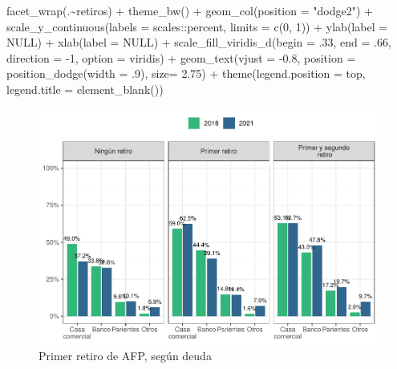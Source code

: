 \documentclass[
  12pt,
]{book}
\newenvironment{Shaded}{\begin{snugshade}}{\end{snugshade}}
\newcommand{\AttributeTok}[1]{\textcolor[rgb]{0.77,0.63,0.00}{#1}}
\newcommand{\ConstantTok}[1]{\textcolor[rgb]{0.00,0.00,0.00}{#1}}
\newcommand{\DecValTok}[1]{\textcolor[rgb]{0.00,0.00,0.81}{#1}}
\newcommand{\FloatTok}[1]{\textcolor[rgb]{0.00,0.00,0.81}{#1}}
\newcommand{\FunctionTok}[1]{\textcolor[rgb]{0.00,0.00,0.00}{#1}}
\newcommand{\NormalTok}[1]{#1}
\newcommand{\SpecialCharTok}[1]{\textcolor[rgb]{0.00,0.00,0.00}{#1}}
\newcommand{\StringTok}[1]{\textcolor[rgb]{0.31,0.60,0.02}{#1}}
\begin{document}
\begin{Shaded}
\begin{Highlighting}[]
  \FunctionTok{facet\_wrap}\NormalTok{(.}\SpecialCharTok{\textasciitilde{}}\NormalTok{retiros) }\SpecialCharTok{+}
  \FunctionTok{theme\_bw}\NormalTok{() }\SpecialCharTok{+} 
  \FunctionTok{geom\_col}\NormalTok{(}\AttributeTok{position =} \StringTok{"dodge2"}\NormalTok{) }\SpecialCharTok{+}
  \FunctionTok{scale\_y\_continuous}\NormalTok{(}\AttributeTok{labels =}\NormalTok{ scales}\SpecialCharTok{::}\NormalTok{percent,}
                     \AttributeTok{limits =} \FunctionTok{c}\NormalTok{(}\DecValTok{0}\NormalTok{, }\DecValTok{1}\NormalTok{)) }\SpecialCharTok{+}
  \FunctionTok{ylab}\NormalTok{(}\AttributeTok{label =} \ConstantTok{NULL}\NormalTok{) }\SpecialCharTok{+}
  \FunctionTok{xlab}\NormalTok{(}\AttributeTok{label =} \ConstantTok{NULL}\NormalTok{) }\SpecialCharTok{+}
  \FunctionTok{scale\_fill\_viridis\_d}\NormalTok{(}\AttributeTok{begin =}\NormalTok{ .}\DecValTok{33}\NormalTok{, }\AttributeTok{end =}\NormalTok{ .}\DecValTok{66}\NormalTok{, }\AttributeTok{direction =} \SpecialCharTok{{-}}\DecValTok{1}\NormalTok{, }\AttributeTok{option =} \StringTok{\textquotesingle{}viridis\textquotesingle{}}\NormalTok{) }\SpecialCharTok{+} 
  \FunctionTok{geom\_text}\NormalTok{(}\AttributeTok{vjust =} \SpecialCharTok{{-}}\FloatTok{0.8}\NormalTok{,}
            \AttributeTok{position =} \FunctionTok{position\_dodge}\NormalTok{(}\AttributeTok{width =}\NormalTok{ .}\DecValTok{9}\NormalTok{),}
            \AttributeTok{size=} \FloatTok{2.75}\NormalTok{)  }\SpecialCharTok{+}
  \FunctionTok{theme}\NormalTok{(}\AttributeTok{legend.position =} \StringTok{\textquotesingle{}top\textquotesingle{}}\NormalTok{,}
        \AttributeTok{legend.title =} \FunctionTok{element\_blank}\NormalTok{())}
\end{Highlighting}
\end{Shaded}

\begin{figure}

{\centering \includegraphics{reporte-elsoc_files/figure-latex/deuda-retiro1-1} 

}

\caption{Primer retiro de AFP, según deuda}\label{fig:deuda-retiro1}
\end{figure}
\end{document}
